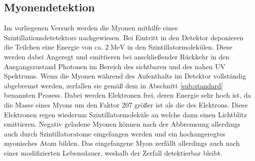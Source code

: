 \subsection{Myonendetektion}
Im vorliegenen Versuch werden die Myonen mithilfe eines Szintillationsdetetektors nachgewiesen. Bei Eintritt in den Detektor deponieren die Teilchen eine
Energie von ca. $\SI{2}{\mega\electronvolt}$ in den Szintillatormolekülen. Diese werden dabei Angeregt und emittieren bei anschließender Rückkehr in den Ausgangszustand
Photonen im Bereich des sichtbaren und des nahen UV Spektrums. Wenn die Myonen während des Aufenthalts im Detektor vollständig abgebremst werden, zerfallen sie
gemäß dem in Abschnitt \ref{sub:standard} benannten Prozess. Dabei werden Elektronen frei, deren Energie sehr hoch ist, da die Masse eines Myons um den Faktor 207
größer ist als die des Elektrons. Diese Elektronen regen wiederum Szintillatormoleküle an welche dann einen Lichtblitz emittieren.
Negativ geladene Myonen können nach der Abbremsung allerdings auch durch Szintillatoratome eingefangen werden und ein hochangeregtes myonisches Atom bilden.
Das eingefangene Myon zerfällt allerdings auch nach einer modifizierten Lebensdauer, weshalb der Zerfall detektierbar bleibt.
